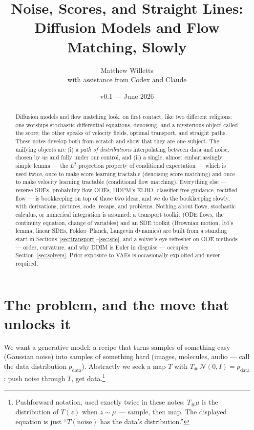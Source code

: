 \documentclass[10pt,a4paper]{article}
\title{Noise, Scores, and Straight Lines:\\
\large Diffusion Models and Flow Matching, Slowly}
\author{Matthew Willetts\\{\small with assistance from Codex and Claude}}
\date{v0.1 --- June 2026}
\begin{document}
\maketitle

\begin{abstract}
\noindent Diffusion models and flow matching look, on first contact, like
two different religions: one worships stochastic differential equations,
denoising, and a mysterious object called the score; the other speaks of
velocity fields, optimal transport, and straight paths. These notes develop
both from scratch and show that they are one subject. The unifying objects
are (i) a \emph{path of distributions} interpolating between data and noise,
chosen by us and fully under our control, and (ii) a single, almost
embarrassingly simple lemma --- the $L^2$ projection property of conditional
expectation --- which is used twice, once to make score learning tractable
(denoising score matching) and once to make velocity learning tractable
(conditional flow matching). Everything else --- reverse SDEs, probability
flow ODEs, DDPM's ELBO, classifier-free guidance, rectified flow --- is
bookkeeping on top of those two ideas, and we do the bookkeeping slowly,
with derivations, pictures, code, recaps, and problems. Nothing about flows,
stochastic calculus, or numerical integration is assumed: a transport
toolkit (ODE flows, the continuity equation, change of variables) and an
SDE toolkit (Brownian motion, It\^o's lemma, linear SDEs,
Fokker--Planck, Langevin dynamics) are built from a standing start in
Sections~\ref{sec:transport}--\ref{sec:sde}, and a solver's-eye
refresher on ODE methods --- order, curvature, and why DDIM is Euler in
disguise --- occupies Section~\ref{sec:solvers}. Prior
exposure to VAEs is occasionally exploited and never required.
\end{abstract}

\tableofcontents

\section{The problem, and the move that unlocks it}

We want a generative model: a recipe that turns samples of something easy
(Gaussian noise) into samples of something hard (images, molecules, audio
--- call the data distribution $p_{\mathrm{data}}$). Abstractly we seek a
map $T$ with $T_\#\,\mathcal{N}(0, I) = p_{\mathrm{data}}$: push noise
through $T$, get data.\footnote{Pushforward notation, used exactly twice
in these notes: $T_\# \mu$ is the distribution of $T(z)$ when
$z \sim \mu$ --- sample, then map. The displayed equation is just
``$T(\text{noise})$ has the data's distribution.''}
\end{document}
